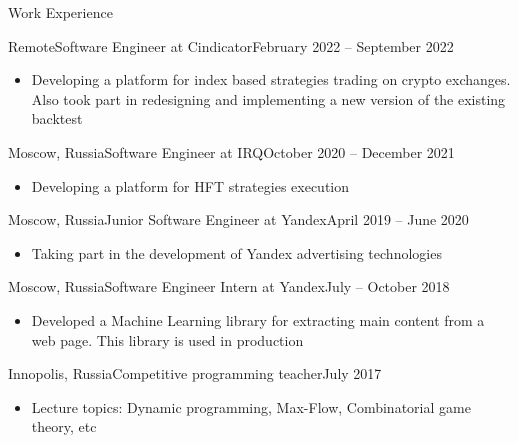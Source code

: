 \documentclass[]{cv/mcdowellcv}
\begin{document}
	\makeheader


        \begin{cvsection}{Work Experience}
            \begin{cvsubsection}{Remote}{Software Engineer at Cindicator}{February 2022 -- September 2022}
                \vskip 0.3cm
                \begin{itemize}
                    \item Developing a platform for index based strategies trading on crypto exchanges. Also took part in redesigning and implementing a new version of the existing backtest
                \end{itemize}
            \end{cvsubsection}
            \begin{cvsubsection}{Moscow, Russia}{Software Engineer at IRQ}{October 2020 -- December 2021}
                \vskip 0.3cm
                \begin{itemize}
                    \item Developing a platform for HFT strategies execution
                \end{itemize}
            \end{cvsubsection}
            \begin{cvsubsection}{Moscow, Russia}{Junior Software Engineer at Yandex}{April 2019 -- June 2020}
                \vskip 0.3cm
                \begin{itemize}
                    \item Taking part in the development of Yandex advertising technologies
                \end{itemize}
            \end{cvsubsection}
            \begin{cvsubsection}{Moscow, Russia}{Software Engineer Intern at Yandex}{July -- October 2018}
                \vskip 0.3cm
                \begin{itemize}
                    \item Developed a Machine Learning library for extracting main content from a web page. This library is used in production
                \end{itemize}
            \end{cvsubsection}
            \begin{cvsubsection}{Innopolis, Russia}{Competitive programming teacher}{July 2017}
                \vskip 0.3cm
                \begin{itemize}
                    \item Lecture topics: Dynamic programming, Max-Flow, Combinatorial game theory, etc
                \end{itemize}
            \end{cvsubsection}
        \end{cvsection}
\end{document}
